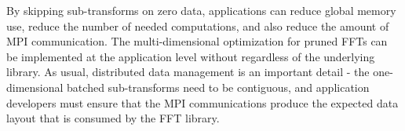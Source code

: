 \documentclass[12pt]{article}
\renewcommand{\(}{\left(}
\renewcommand{\)}{\right)}
\begin{document}
By skipping sub-transforms on zero data, applications can reduce
global memory use, reduce the number of needed computations, and also
reduce the amount of MPI communication.  The multi-dimensional
optimization for pruned FFTs can be implemented at the application
level without regardless of the underlying library.  As usual,
distributed data management is an important detail - the
one-dimensional batched sub-transforms need to be contiguous, and
application developers must ensure that the MPI communications produce
the expected data layout that is consumed by the FFT library.
\end{document}
